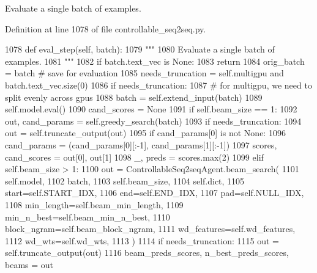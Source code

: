 \begin{DoxyVerb}Evaluate a single batch of examples.
\end{DoxyVerb}
 

Definition at line 1078 of file controllable\+\_\+seq2seq.\+py.


\begin{DoxyCode}
1078     \textcolor{keyword}{def }eval\_step(self, batch):
1079         \textcolor{stringliteral}{"""}
1080 \textcolor{stringliteral}{        Evaluate a single batch of examples.}
1081 \textcolor{stringliteral}{        """}
1082         \textcolor{keywordflow}{if} batch.text\_vec \textcolor{keywordflow}{is} \textcolor{keywordtype}{None}:
1083             \textcolor{keywordflow}{return}
1084         orig\_batch = batch  \textcolor{comment}{# save for evaluation}
1085         needs\_truncation = self.multigpu \textcolor{keywordflow}{and} batch.text\_vec.size(0) %
1086         \textcolor{keywordflow}{if} needs\_truncation:
1087             \textcolor{comment}{# for multigpu, we need to split evenly across gpus}
1088             batch = self.extend\_input(batch)
1089         self.model.eval()
1090         cand\_scores = \textcolor{keywordtype}{None}
1091         \textcolor{keywordflow}{if} self.beam\_size == 1:
1092             out, cand\_params = self.greedy\_search(batch)
1093             \textcolor{keywordflow}{if} needs\_truncation:
1094                 out = self.truncate\_output(out)
1095                 \textcolor{keywordflow}{if} cand\_params[0] \textcolor{keywordflow}{is} \textcolor{keywordflow}{not} \textcolor{keywordtype}{None}:
1096                     cand\_params = (cand\_params[0][:-1], cand\_params[1][:-1])
1097             scores, cand\_scores = out[0], out[1]
1098             \_, preds = scores.max(2)
1099         \textcolor{keywordflow}{elif} self.beam\_size > 1:
1100             out = ControllableSeq2seqAgent.beam\_search(
1101                 self.model,
1102                 batch,
1103                 self.beam\_size,
1104                 self.dict,
1105                 start=self.START\_IDX,
1106                 end=self.END\_IDX,
1107                 pad=self.NULL\_IDX,
1108                 min\_length=self.beam\_min\_length,
1109                 min\_n\_best=self.beam\_min\_n\_best,
1110                 block\_ngram=self.beam\_block\_ngram,
1111                 wd\_features=self.wd\_features,
1112                 wd\_wts=self.wd\_wts,
1113             )
1114             \textcolor{keywordflow}{if} needs\_truncation:
1115                 out = self.truncate\_output(out)
1116             beam\_preds\_scores, n\_best\_preds\_scores, beams = out

\end{DoxyCode}
